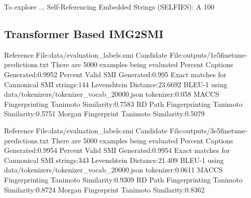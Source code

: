 \begin{table}[b]
    \caption{Table 1: Finetune Encoder. }
\end{table}
To explore ...
Self-Referencing Embedded Strings (SELFIES): A 100%
\subsection{Transformer Based IMG2SMI}
Reference File:data/evaluation_labels.smi
Candidate File:outputs/1e5finetune-predictions.txt
There are 5000 examples being evaluated
Percent Captions Generated:0.9952
Percent Valid SMI Generated:0.995
Exact matches for Cannonical SMI strings:144
Levenshtein Distance:23.6692
BLEU-1 using data/tokenizers/tokenizer_vocab_20000.json tokenizer:0.058
MACCS Fingerprinting Tanimoto Similarity:0.7583
RD Path Fingerprinting Tanimoto Similarity:0.5751
Morgan Fingerprint Tanimoto Similarity:0.5079

Reference File:data/evaluation_labels.smi
Candidate File:outputs/3e5finetune-predictions.txt
There are 5000 examples being evaluated
Percent Captions Generated:0.9954
Percent Valid SMI Generated:0.9954
Exact matches for Cannonical SMI strings:343
Levenshtein Distance:21.409
BLEU-1 using data/tokenizers/tokenizer_vocab_20000.json tokenizer:0.0611
MACCS Fingerprinting Tanimoto Similarity:0.9309
RD Path Fingerprinting Tanimoto Similarity:0.8724
Morgan Fingerprint Tanimoto Similarity:0.8362

